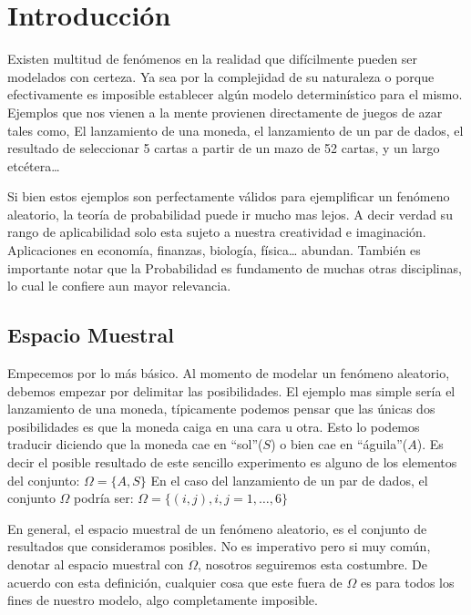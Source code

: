 \documentclass[14pt]{extreport}
\newcounter{ejemplo}[chapter]
\begin{document}
\chapter{Introducción}



Existen multitud de fenómenos en la realidad que difícilmente pueden ser modelados con certeza. Ya sea por la complejidad de su naturaleza o
porque efectivamente es imposible establecer algún modelo determinístico para el mismo. Ejemplos que nos vienen a la mente provienen directamente
de juegos de azar tales como, El lanzamiento de una moneda, el lanzamiento de un par de dados, el resultado de seleccionar 5 cartas a partir de un mazo de 52 cartas, y un largo etcétera\ldots{}

Si bien estos ejemplos son perfectamente válidos para ejemplificar un fenómeno aleatorio, la teoría de probabilidad puede ir mucho mas lejos. A decir verdad su rango de aplicabilidad solo esta sujeto a nuestra creatividad e imaginación. Aplicaciones en economía, finanzas, biología, física\dots{} abundan. También es importante notar que la Probabilidad es fundamento de muchas otras disciplinas, lo cual le confiere aun mayor relevancia.


\section{Espacio Muestral}

Empecemos por lo más básico. Al momento de modelar un fenómeno aleatorio, debemos empezar por delimitar las posibilidades. El ejemplo mas simple sería el lanzamiento de una moneda, típicamente podemos pensar que las únicas dos posibilidades es que la moneda caiga en una cara u otra. Esto lo podemos traducir diciendo que la moneda cae en ``sol''($S$) o bien cae en ``águila''($A$). Es decir el posible resultado de este sencillo experimento es alguno de los elementos del conjunto: $\Omega = \{A, S\}$ En el caso del lanzamiento de un par de dados, el conjunto $\Omega$ podría ser: $\Omega = \{(i , j), i , j = 1,\ldots , 6\}$

En general, el espacio muestral de un fenómeno aleatorio, es el conjunto de resultados que consideramos posibles. No es imperativo pero si muy común, denotar al espacio muestral con $\Omega$, nosotros seguiremos esta costumbre. De acuerdo con esta definición, cualquier cosa que este fuera de $\Omega$ es para todos los fines de nuestro modelo, algo completamente imposible.
\end{document}

